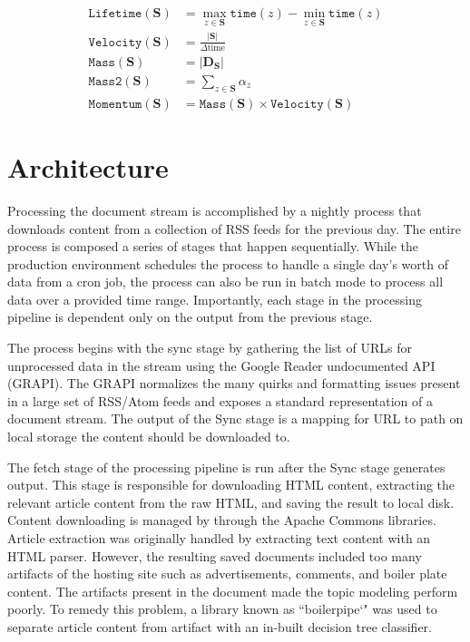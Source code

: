 \documentclass[10pt,twocolumn]{article}
\begin{document}
\begin{align}
\texttt{Lifetime}(\mathbf{S}) &=\max_{z \in \mathbf{S}} \texttt{time}(z) - \min_{z \in \mathbf{S}}\texttt{time}(z) \\
\texttt{Velocity}(\mathbf{S}) &= \frac{|\mathbf{S}|}{\Delta \text{time}} \\
\texttt{Mass}(\mathbf{S}) & = |\mathbf{D}_\mathbf{S}| \\
\texttt{Mass2}(\mathbf{S}) & = \sum_{z \in \mathbf{S}} \alpha_z\\
\texttt{Momentum}(\mathbf{S}) &= \texttt{Mass}(\mathbf{S}) \times \texttt{Velocity}(\mathbf{S})
\end{align}

\section {Architecture}

Processing the document stream is accomplished by a nightly process that downloads content from a collection of RSS feeds for the previous day.  The entire process is composed a series of stages that happen sequentially.  While the production environment schedules the process to handle a single day's worth of data from a cron job, the process can also be run in batch mode to process all data over a provided time range.  Importantly, each stage in the processing pipeline is dependent only on the output from the previous stage.

The process begins with the sync stage by gathering the list of URLs for unprocessed data in the stream using the Google Reader undocumented API (GRAPI).  The GRAPI normalizes the many quirks and formatting issues present in a large set of RSS/Atom feeds and exposes a standard representation of a document stream.  The output of the Sync stage is a mapping for URL to path on local storage the content should be downloaded to.

The fetch stage of the processing pipeline is run after the Sync stage generates output.  This stage is responsible for downloading HTML content, extracting the relevant article content from the raw HTML, and saving the result to local disk.  Content downloading is managed by through the Apache Commons libraries.  Article extraction was originally handled by extracting text content with an HTML parser.  However, the resulting saved documents included too many artifacts of the hosting site such as advertisements, comments, and boiler plate content.  The artifacts present in the document made the topic modeling perform poorly.  To remedy this problem, a library known as ``boilerpipe`" was used to separate article content from artifact with an in-built decision tree classifier.
\end{document}
